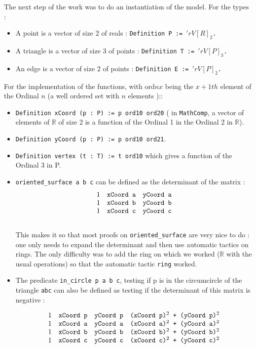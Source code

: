 \documentclass[a4paper,10pt]{article}
\begin{document}
The next step of the work was to do an instantiation of the model. For the types :
\begin{itemize}
\item A point is a vector of size 2 of reals : {\tt Definition P := $'rV[R]_2$. }
\item A triangle is a vector of size 3 of points : {\tt Definition T := $'rV[P]_3$. }
\item An edge is a vector of size 2 of points : {\tt Definition E := $'rV[P]_2$. }
\end{itemize}
For the implementation of the functions, with ord$nx$ being the $x+1{th}$ element of the Ordinal $n$ (a well ordered set with $n$ elements )::
\begin{itemize}
  \item {\tt Definition xCoord (p : P) := p ord10 ord20} ( in {\tt MathComp}, a vector of elements of $\mathbb{R}$ of size 2 is a function of the Ordinal 1 in the Ordinal 2 in $\mathbb{R}$). 
  \item {\tt Definition yCoord (p : P) := p ord10 ord21}.
   \item {\tt Definition vertex (t : T) := t ord10} which gives a function of the Ordinal 3 in P.
\item {\tt oriented\_surface a b c} can be defined as the determinant of the matrix :
  $$\begin{matrix}
1 & \text{{\tt xCoord  a}} & \text{{\tt yCoord  a}}\\
1 & \text{{\tt xCoord  b}} & \text{{\tt yCoord  b}}\\
1 & \text{{\tt xCoord  c}} & \text{{\tt yCoord  c}}
\end{matrix}$$\\
This makes it so that most proofs on {\tt oriented\_surface} are very nice to do : one only needs to expand the determinant and then use automatic tactics on rings. The only difficulty was to add the ring on which we worked ($\mathbb{R}$ with the usual operations) so that the automatic tactic {\tt ring} worked.

\item The predicate {\tt in\_circle p a b c}, testing if p is in the circumcircle of the triangle {\tt abc} can also be defined as testing if the determinant of this matrix is negative :

  $$\begin{matrix}
1 & \text{{\tt xCoord  p}} & \text{{\tt yCoord  p}}& \text{{\tt (xCoord  p)$^2$ + (yCoord  p)$^2$}}\\
1 & \text{{\tt xCoord  a}} & \text{{\tt yCoord  a}}& \text{{\tt (xCoord  a)$^2$ + (yCoord  a)$^2$}}\\
1 & \text{{\tt xCoord  b}} & \text{{\tt yCoord  b}}& \text{{\tt (xCoord  b)$^2$ + (yCoord  b)$^2$}}\\
1 & \text{{\tt xCoord  c}} & \text{{\tt yCoord  c}}& \text{{\tt (xCoord  c)$^2$ + (yCoord  c)$^2$}}
\end{matrix}$$\\
\end{itemize}
\end{document}
